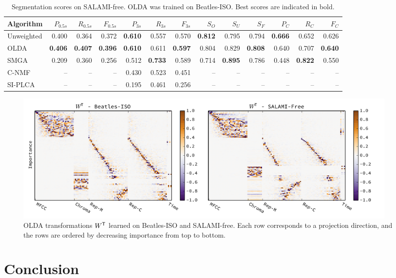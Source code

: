 \documentclass{article}
\begin{document}
\begin{table}
\centering
\caption{Segmentation scores on SALAMI-free. OLDA was trained on Beatles-ISO. Best scores are
indicated in bold.\label{tab:results:salami}}
\begin{tabular}{lrrrrrrrrrrrr}
\toprule%
Algorithm       &   $P_{0.5s}$ & $R_{0.5s}$ & $F_{0.5s}$ & $P_{3s}$     & $R_{3s}$   & $F_{3s}$   & $S_O$ & $S_U$ & $S_F$ & $P_C$& $R_C$& $F_C$\\
\hline
Unweighted  & 0.400 & 0.364 & 0.372 & \textbf{0.610} & 0.557 & 0.570 & \textbf{0.812} & 0.795 & 0.794 & \textbf{0.666} & 0.652 & 0.626\\
OLDA    & \textbf{0.406} & \textbf{0.407} & \textbf{0.396} & \textbf{0.610} & 0.611 & \textbf{0.597} & 0.804 & 0.829 & \textbf{0.808} & 0.640 & 0.707 & \textbf{0.640}\\
\hline
SMGA~\hfill\cite{serra2012unsupervised}
        & 0.209 & 0.360 & 0.256 & 0.512 & \textbf{0.733} & 0.589 & 0.714 & \textbf{0.895} & 0.786 & 0.448 & \textbf{0.822} & 0.550\\
C-NMF~\hfill\cite{nieto2013convex}            
        & -- & -- & -- & 0.430 & 0.523 & 0.451 & -- & -- & -- & -- & -- & -- \\
SI-PLCA~\hfill\cite{weiss2011unsupervised}    
        & -- & -- & -- & 0.195 & 0.461 & 0.256 & -- & -- & -- & -- & -- & -- \\  
\bottomrule%
\end{tabular}
\end{table}

\begin{figure}
\centering%
\includegraphics[width=0.95\textwidth]{figs/w}%
\caption{OLDA transformations $W^\mathsf{T}$ learned on Beatles-ISO and SALAMI-free. Each row corresponds to a projection
direction, and the rows are ordered by decreasing importance from top to bottom.\label{fig:w}}
\end{figure}

\section{Conclusion}
\label{sec:conclusion}




\end{document}

